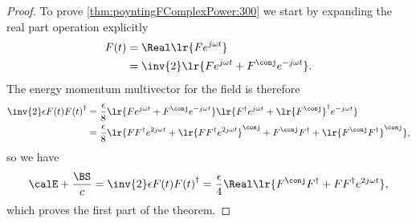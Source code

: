 %
%


\begin{proof}
To prove \cref{thm:poyntingFComplexPower:300} we start by expanding the real part operation explicitly
\begin{equation}\label{eqn:poyntingFComplexPower:20}
\begin{aligned}
F(t)
&= \Real\lr{ F e^{j \omega t} } \\
&= \inv{2} \lr{ F e^{j \omega t} + F^\conj e^{-j\omega t} }.
\end{aligned}
\end{equation}
The energy momentum multivector for the field is therefore
\begin{equation}\label{eqn:poyntingFComplexPower:40}
\begin{aligned}
\inv{2} \epsilon F(t) {F(t)}^\dagger
&=
\frac{\epsilon}{8}
\lr{
F e^{j \omega t} + F^\conj e^{-j\omega t}
}
\lr{
F^\dagger e^{j \omega t} + \lr{F^\conj}^\dagger e^{-j\omega t}
} \\
&=
\frac{\epsilon}{8}
\lr{
F F^\dagger e^{2 j \omega t}
+
\lr{ F F^\dagger e^{2 j \omega t} }^\conj
+
F^\conj F^\dagger + \lr{ F^\conj F^\dagger }^\conj
},
\end{aligned}
\end{equation}
so we have
\begin{dmath}\label{eqn:poyntingFComplexPower:60}
\calE + \frac{\BS}{c}
=
\inv{2} \epsilon F(t) {F(t)}^\dagger
=
\frac{\epsilon}{4} \Real \lr{ F^\conj F^\dagger + F F^\dagger e^{2 j \omega t} },
\end{dmath}
which proves the first part of the theorem.


\end{proof}

